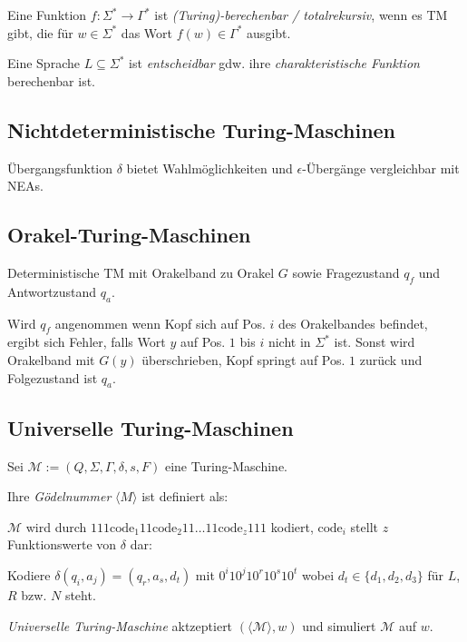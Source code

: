 \spacing

Eine Funktion $f : \Sigma^* \to \Gamma^*$ ist \emph{(Turing)-berechenbar / totalrekursiv}, wenn es TM gibt, die für $w \in \Sigma^*$ das Wort $f(w) \in \Gamma^*$ ausgibt.

\spacing

Eine Sprache $L \subseteq \Sigma^*$ ist \emph{entscheidbar} gdw. ihre \emph{charakteristische Funktion} berechenbar ist.

\subsection*{Nichtdeterministische Turing-Maschinen}

Übergangsfunktion $\delta$ bietet Wahlmöglichkeiten und $\epsilon$-Übergänge vergleichbar mit NEAs.

\subsection*{Orakel-Turing-Maschinen}

Deterministische TM mit Orakelband zu Orakel $G$ sowie Fragezustand $q_f$ und Antwortzustand $q_a$.

\spacing

Wird $q_f$ angenommen wenn Kopf sich auf Pos. $i$ des Orakelbandes befindet, ergibt sich Fehler, falls Wort $y$ auf Pos. $1$ bis $i$ nicht in $\Sigma^*$ ist. Sonst wird Orakelband mit $G(y)$ überschrieben, Kopf springt auf Pos. $1$ zurück und Folgezustand ist $q_a$.

\subsection*{Universelle Turing-Maschinen}

Sei $\mathcal{M} := (Q,\Sigma,\Gamma,\delta,s,F)$ eine Turing-Maschine.

Ihre \emph{Gödelnummer} $\langle M \rangle$ ist definiert als:

\spacing

$\mathcal{M}$ wird durch $111\text{code}_1 11\text{code}_2 11 \dots 11\text{code}_z 111$ kodiert, $\text{code}_i$ stellt $z$ Funktionswerte von $\delta$ dar:

\spacing

Kodiere $\delta(q_i,a_j) = (q_r,a_s,d_t)$ mit $0^i10^j10^r10^s10^t$ wobei $d_t \in \{d_1,d_2,d_3\}$ für $L$, $R$ bzw. $N$ steht.

\spacing

\emph{Universelle Turing-Maschine} aktzeptiert $(\langle \mathcal{M} \rangle, w)$ und simuliert $\mathcal{M}$ auf $w$.

